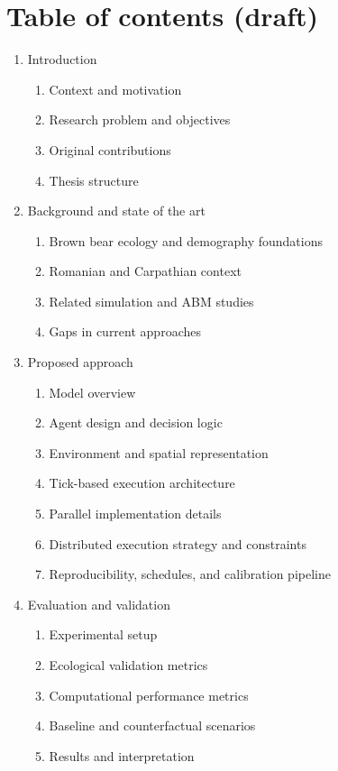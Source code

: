 \chapter*{Table of contents (draft)}

\begin{enumerate}
    \item Introduction
    \begin{enumerate}
        \item Context and motivation
        \item Research problem and objectives
        \item Original contributions
        \item Thesis structure
    \end{enumerate}

    \item Background and state of the art
    \begin{enumerate}
        \item Brown bear ecology and demography foundations
        \item Romanian and Carpathian context
        \item Related simulation and ABM studies
        \item Gaps in current approaches
    \end{enumerate}

    \item Proposed approach
    \begin{enumerate}
        \item Model overview
        \item Agent design and decision logic
        \item Environment and spatial representation
        \item Tick-based execution architecture
        \item Parallel implementation details
        \item Distributed execution strategy and constraints
        \item Reproducibility, schedules, and calibration pipeline
    \end{enumerate}

    \item Evaluation and validation
    \begin{enumerate}
        \item Experimental setup
        \item Ecological validation metrics
        \item Computational performance metrics
        \item Baseline and counterfactual scenarios
        \item Results and interpretation
    \end{enumerate}


\end{enumerate}
